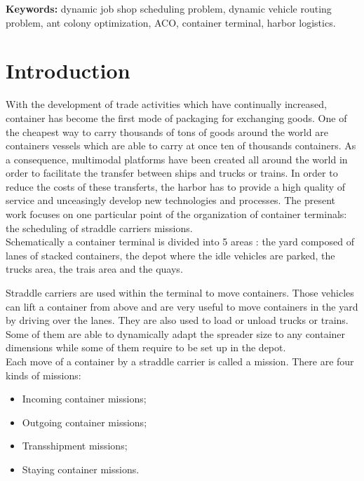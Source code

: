 \documentclass[a4paper,10pt]{article}
\begin{document}
{\bf Keywords: } dynamic job shop scheduling problem, dynamic vehicle routing problem, ant colony optimization, ACO, container terminal, harbor logistics.\\

\section{Introduction}

With the development of trade activities which have continually increased, container has become the first mode of packaging for exchanging goods. One of the cheapest way to carry thousands of tons of goods around the world are containers vessels which are able to carry at once ten of thousands containers. As a consequence, multimodal platforms have been created all around the world in order to facilitate the transfer between ships and trucks or trains. In order to reduce the costs of these transferts, the harbor has to provide a high quality of service and unceasingly develop new technologies and processes. The present work focuses on one particular point of the organization of container terminals: the scheduling of straddle carriers missions.\\

Schematically a container terminal is divided into 5 areas : the yard composed of lanes of stacked containers, the depot where the idle vehicles are parked, the trucks area, the trais area and the quays.

Straddle carriers are used within the terminal to move containers. Those vehicles can lift a container from above and are very useful to move containers in the yard by driving over the lanes. They are also used to load or unload trucks or trains. Some of them are able to dynamically adapt the spreader size to any container dimensions while some of them require to be set up in the depot.\\%


Each move of a container by a straddle carrier is called a mission. There are four kinds of missions:
\begin{itemize}
	\item Incoming container missions;
	\item Outgoing container missions;
	\item Transshipment missions;
	\item Staying container missions.
\end{itemize}
\end{document}

